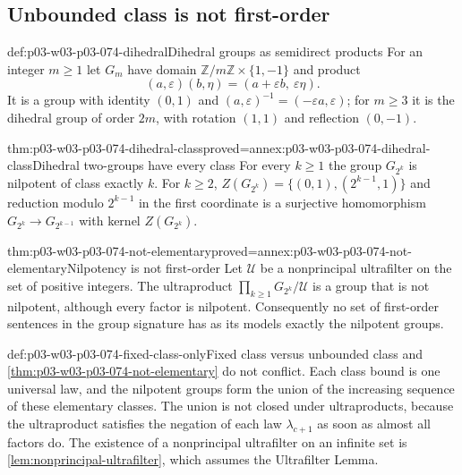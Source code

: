 \subsection{Unbounded class is not first-order}
\label{sec:p03-w03-p03-074-unbounded}

\begin{hbdefinition}{def:p03-w03-p03-074-dihedral}{Dihedral groups as semidirect products}
For an integer \(m\ge1\) let \(G_m\) have domain
\(\mathbb Z/m\mathbb Z\times\{1,-1\}\) and product
\[
  (a,\varepsilon)(b,\eta)=(a+\varepsilon b,\ \varepsilon\eta).
\]
It is a group with identity \((0,1)\) and
\((a,\varepsilon)^{-1}=(-\varepsilon a,\varepsilon)\); for \(m\ge3\) it is
the dihedral group of order \(2m\), with rotation \((1,1)\) and
reflection \((0,-1)\).
\end{hbdefinition}

\begin{hblemma}{thm:p03-w03-p03-074-dihedral-class}{proved=annex:p03-w03-p03-074-dihedral-class}{Dihedral two-groups have every class}
For every \(k\ge1\) the group \(G_{2^k}\) is nilpotent of class exactly
\(k\). For \(k\ge2\), \(Z(G_{2^k})=\{(0,1),(2^{k-1},1)\}\) and reduction
modulo \(2^{k-1}\) in the first coordinate is a surjective homomorphism
\(G_{2^k}\to G_{2^{k-1}}\) with kernel \(Z(G_{2^k})\).
\end{hblemma}

\begin{hbtheorem}{thm:p03-w03-p03-074-not-elementary}{proved=annex:p03-w03-p03-074-not-elementary}{Nilpotency is not first-order}
Let \(\mathcal U\) be a nonprincipal ultrafilter on the set of positive
integers. The ultraproduct \(\prod_{k\ge1}G_{2^k}/\mathcal U\) is a group
that is not nilpotent, although every factor is nilpotent. Consequently no
set of first-order sentences in the group signature has as its models
exactly the nilpotent groups.
\end{hbtheorem}

\begin{hbwarning}{def:p03-w03-p03-074-fixed-class-only}{Fixed class versus unbounded class}
 and
\cref{thm:p03-w03-p03-074-not-elementary} do not conflict. Each class
bound is one universal law, and the nilpotent groups form the union of the
increasing sequence of these elementary classes. The union is not closed
under ultraproducts, because the ultraproduct satisfies the negation of each
law \(\lambda_{c+1}\) as soon as almost all factors do. The existence of
a nonprincipal ultrafilter on an infinite set is
\cref{lem:nonprincipal-ultrafilter}, which assumes the Ultrafilter
Lemma.
\end{hbwarning}

